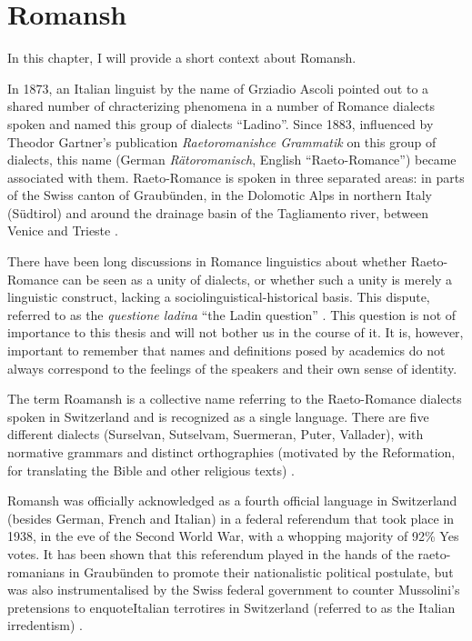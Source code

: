 \chapter{Romansh}

In this chapter, I will provide a short context about Romansh.

In 1873, an Italian linguist by the name of Grziadio Ascoli pointed out to a shared number of chracterizing phenomena in a number of Romance dialects spoken and named this group of dialects \enquote{Ladino}. 
Since 1883, influenced by Theodor Gartner's publication \emph{Raetoromanishce Grammatik} on this group of dialects, this name (German \emph{Rätoromanisch}, English \enquote{Raeto-Romance}) became associated with them. 
Raeto-Romance is spoken in three separated areas: in parts of the Swiss canton of Graubünden, in the Dolomotic Alps in northern Italy (Südtirol) and around the drainage basin of the Tagliamento river, between Venice and Trieste \autocite[1]{haiman1992}.

There have been long discussions in Romance linguistics about whether Raeto-Romance can be seen as a unity of dialects, or whether such a unity is merely a linguistic construct, lacking a sociolinguistical-historical basis. 
This dispute, referred to as the \emph{questione ladina} \enquote{the Ladin question} \autocite{liver1999}. 
This question is not of importance to this thesis and will not bother us in the course of it. 
It is, however, important to remember that names and definitions posed by academics do not always correspond to the feelings of the speakers and their own sense of identity.

The term Roamansh is a collective name referring to the Raeto-Romance dialects spoken in Switzerland and is recognized as a single language. 
There are five different dialects (Surselvan, Sutselvam, Suermeran, Puter, Vallader), with normative grammars and distinct orthographies (motivated by the Reformation, for translating the Bible and other religious texts) \autocite[1]{haiman1992}.

Romansh was officially acknowledged as a fourth official language in Switzerland (besides German, French and Italian) in a federal referendum that took place in 1938, in the eve of the Second World War, with a whopping majority of 92\% Yes votes. 
It has been shown that this referendum played in the hands of the raeto-romanians in Graubünden to promote their nationalistic political postulate, but was also instrumentalised by the Swiss federal government to counter Mussolini's pretensions to enquote{Italian} terrotires in Switzerland (referred to as the Italian irredentism) \autocite{valaer2012}.

